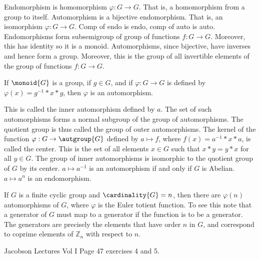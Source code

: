 \documentclass{article}                                                        %
\begin{document}
                Endomorphism is homomorphism $\varphi:G\rightarrow{G}$. That is,
                a homomorphism from a group to itself. Automorphism is a
                bijective endomorphism. That is, an isomorphism
                $\varphi:G\rightarrow{G}$. Comp of endo is endo, comp of auto is
                auto. Endomorphisms form subsemigroup of group of functions
                $f:G\rightarrow{G}$. Moreover, this has identity so it is a
                monoid. Automorphisms, since bijective, have inverses and hence
                form a group. Moreover, this is the group of all invertible
                elements of the group of functions $f:G\rightarrow{G}$.
                \begin{theorem}
                    If $\monoid{G}$ is a group, if $g\in{G}$, and if
                    $\varphi:G\rightarrow{G}$ is defined by
                    $\varphi(x)=g^{\minus{1}}*x*g$, then $\varphi$ is an
                    automorphism.
                \end{theorem}
                This is called the inner automorphism defined by $a$. The set
                of such automorphisms forms a normal subgroup of the group of
                automorphisms. The quotient group is thus called the group of
                outer automorphisms. The kernel of the function
                $\varphi:G\rightarrow\autgroup{G}$ defined by
                $a\mapsto{f}$, where $f(x)=a^{\minus{1}}*x*a$, is called the
                center. This is the set of all elements $x\in{G}$ such that
                $x*y=y*x$ for all $y\in{G}$. The group of inner automorphisms is
                isomorphic to the quotient group of $G$ by its center.
                $a\mapsto{a}^{\minus{1}}$ is an automorphism if and only if
                $G$ is Abelian. $a\mapsto{a}^{n}$ is an endomorphism.
                \begin{example}
                    If $G$ is a finite cyclic group and $\cardinality{G}=n$,
                    then there are $\varphi(n)$ automorphisms of $G$, where
                    $\varphi$ is the Euler totient function. To see this note
                    that a generator of $G$ must map to a generator if the
                    function is to be a generator. The generators are precisely
                    the elements that have order $n$ in $G$, and correspond to
                    coprime elements of $\mathbb{Z}_{n}$ with respect to $n$.
                \end{example}
                Jacobson Lectures Vol I Page 47 exercises 4 and 5.
\end{document}
